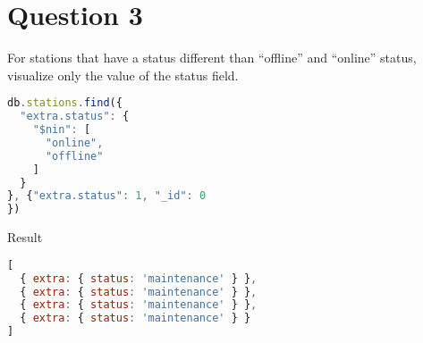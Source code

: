 \section{Question 3}

\begin{question}
  For stations that have a status different than “offline” and “online”
  status, visualize only the value of the status field.
\end{question}

\begin{answer}

  \begin{lstlisting}[language=js]
db.stations.find({
  "extra.status": {
    "$nin": [
      "online",
      "offline"
    ]
  }
}, {"extra.status": 1, "_id": 0
})
  \end{lstlisting}
  Result
  \begin{lstlisting}[language=js]
[
  { extra: { status: 'maintenance' } },
  { extra: { status: 'maintenance' } },
  { extra: { status: 'maintenance' } },
  { extra: { status: 'maintenance' } }
]
  \end{lstlisting}

\end{answer}
